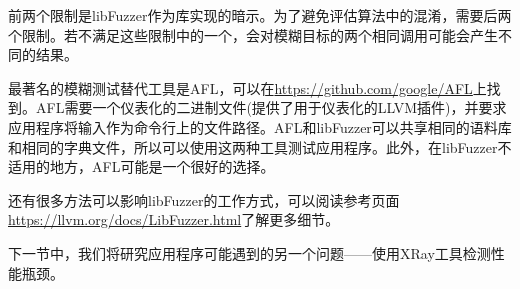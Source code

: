 前两个限制是libFuzzer作为库实现的暗示。为了避免评估算法中的混淆，需要后两个限制。若不满足这些限制中的一个，会对模糊目标的两个相同调用可能会产生不同的结果。

最著名的模糊测试替代工具是AFL，可以在\url{https://github.com/google/AFL}上找到。AFL需要一个仪表化的二进制文件(提供了用于仪表化的LLVM插件)，并要求应用程序将输入作为命令行上的文件路径。AFL和libFuzzer可以共享相同的语料库和相同的字典文件，所以可以使用这两种工具测试应用程序。此外，在libFuzzer不适用的地方，AFL可能是一个很好的选择。

还有很多方法可以影响libFuzzer的工作方式，可以阅读参考页面\url{https://llvm.org/docs/LibFuzzer.html}了解更多细节。

下一节中，我们将研究应用程序可能遇到的另一个问题——使用XRay工具检测性能瓶颈。




























